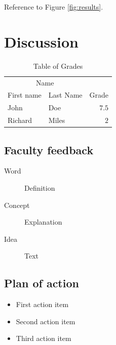 \documentclass[fleqn,10pt]{SelfArx}\usepackage[]{graphicx}\usepackage[]{color}
\begin{document}
Reference to Figure \ref{fig:results}.


\section{Discussion}

\lipsum[1] %

\lipsum[1] %

\begin{table}[hbt]
\caption{Table of Grades}
\centering
\begin{tabular}{llr}
\toprule
\multicolumn{2}{c}{Name} \\
\cmidrule(r){1-2}
First name & Last Name & Grade \\
\midrule
John & Doe & $7.5$ \\
Richard & Miles & $2$ \\
\bottomrule
\end{tabular}
\label{tab:label}
\end{table}

\subsection{Faculty feedback}
\lipsum[1] %

\begin{description}
\item[Word] Definition
\item[Concept] Explanation
\item[Idea] Text
\end{description}

\lipsum[1] %

\subsection{Plan of action}
\lipsum[1] %
\begin{itemize}[noitemsep] %
\item First action item
\item Second action item
\item Third action item
\end{itemize}

\end{document}
